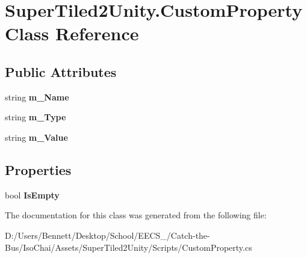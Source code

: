 \hypertarget{class_super_tiled2_unity_1_1_custom_property}{}\section{Super\+Tiled2\+Unity.\+Custom\+Property Class Reference}
\label{class_super_tiled2_unity_1_1_custom_property}
\subsection*{Public Attributes}
\begin{DoxyCompactItemize}
\item 
\mbox{\label{class_super_tiled2_unity_1_1_custom_property_a93c3ca8808b6e77a28e30d939526d9cb}} 
string {\bfseries m\+\_\+\+Name}
\item 
\mbox{\label{class_super_tiled2_unity_1_1_custom_property_a096fe1866006a2fd07b188de72048b63}} 
string {\bfseries m\+\_\+\+Type}
\item 
\mbox{\label{class_super_tiled2_unity_1_1_custom_property_a507667d924a12678558d25419c108dc5}} 
string {\bfseries m\+\_\+\+Value}
\end{DoxyCompactItemize}
\subsection*{Properties}
\begin{DoxyCompactItemize}
\item 
\mbox{\label{class_super_tiled2_unity_1_1_custom_property_a8fa170cc847ad8c0294ca54e4bf619d0}} 
bool {\bfseries Is\+Empty}
\end{DoxyCompactItemize}


The documentation for this class was generated from the following file\+:\begin{DoxyCompactItemize}
\item 
D\+:/\+Users/\+Bennett/\+Desktop/\+School/\+E\+E\+C\+S\+\_/\+Catch-\/the-\/\+Bus/\+Iso\+Chai/\+Assets/\+Super\+Tiled2\+Unity/\+Scripts/Custom\+Property.\+cs\end{DoxyCompactItemize}
